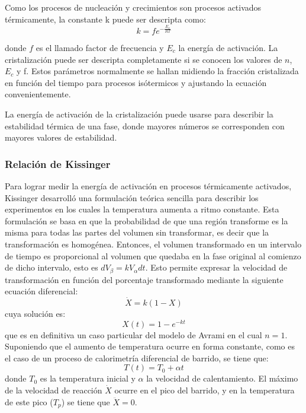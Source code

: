 \documentclass[12pt]{article}
\theoremstyle{definition}
\theoremstyle{remark}
\begin{document}
Como los procesos de nucleación y crecimientos son procesos activados térmicamente, la constante k puede ser descripta como:
\begin{equation}
\label{kvalue}
	k=fe^{-\frac{E_c}{RT}}
\end{equation}

donde $f$ es el llamado factor de frecuencia y $E_c$ la energía de activación.
La cristalización puede ser descripta completamente si se conocen los valores de $n$, $E_c$ y f. Estos parámetros normalmente se hallan midiendo la fracción cristalizada en función del tiempo para procesos isótermicos y ajustando la ecuación convenientemente.

La energía de activación de la cristalización puede usarse para describir la estabilidad térmica de una fase, donde mayores números se corresponden con mayores valores de estabilidad.

\subsubsection{Relación de Kissinger}
Para lograr medir la energía de activación en procesos térmicamente activados, Kissinger desarrolló una formulación teórica sencilla para describir los experimentos en los cuales la temperatura aumenta a ritmo constante. Esta formulación se basa en que la probabilidad de que una región transforme es la misma para todas las partes del volumen sin transformar, es decir que la transformación es homogénea. Entonces, el volumen transformado en un intervalo de tiempo es proporcional al volumen que quedaba en la fase original al comienzo de dicho intervalo, esto es $dV_\beta = k V_\alpha dt$. Esto permite expresar la velocidad de transformación en función del porcentaje transformado mediante la siguiente ecuación diferencial:
\begin{equation}
	\dot{X} = k(1-X)
\end{equation}
cuya solución es:
\begin{equation}
	X(t) = 1 - e^{-kt}
\end{equation}
que es en definitiva un caso particular del modelo de Avrami en el cual $n=1$.
Suponiendo que el aumento de temperatura ocurre en forma constante, como es el caso de un proceso de calorimetría diferencial de barrido, se tiene que:
\begin{equation}
	T(t) = T_0+\alpha t
\end{equation}
donde $T_0$ es la temperatura inicial y $\alpha$ la velocidad de calentamiento. El máximo de la velocidad de reacción $\dot{X}$ ocurre en el pico del barrido, y en la temperatura de este pico ($T_p$) se tiene que $\ddot{X} = 0$.
\end{document}
